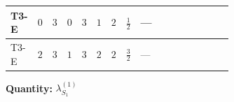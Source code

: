 \documentclass[8pt]{article}
\begin{document}
\begin{landscape}
\begin{longtable}{@{}llcccccc >{\raggedright\arraybackslash}p{0.21\linewidth} >{\raggedright\arraybackslash}p{0.21\linewidth} >{\raggedright\arraybackslash}p{0.21\linewidth}@{}}
\midrule
T3-E & $0$ & $3$ & $0$ & $3$ & $1$ & $2$ & $\frac{1}{2}$ & --- & \scriptsize\adjustbox{max width=\linewidth}{$\begin{gathered} +6 {\lambda_{12}^{(1)}}^2\end{gathered}$} & \scriptsize\adjustbox{max width=\linewidth}{$\begin{gathered} +4 {\lambda_{HS_1}^{(1)}}^2\end{gathered}$} \\
\midrule
T3-E & $2$ & $3$ & $1$ & $3$ & $2$ & $2$ & $\frac{3}{2}$ & --- & \scriptsize\adjustbox{max width=\linewidth}{$\begin{gathered} +6 {\lambda_{12}^{(1)}}^2\end{gathered}$} & \scriptsize\adjustbox{max width=\linewidth}{$\begin{gathered} +4 {\lambda_{HS_1}^{(1)}}^2\end{gathered}$} \\
\midrule
\bottomrule
\end{longtable}
\clearpage
\noindent\textbf{Quantity: }$\lambda_{S_1}^{(1)}$\par\smallskip

\end{landscape}
\end{document}
